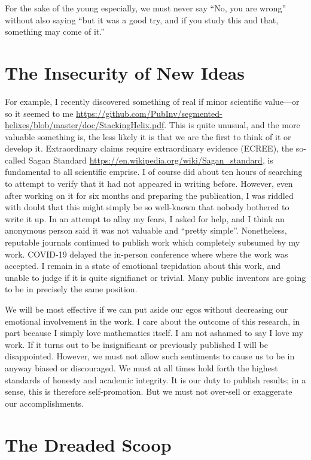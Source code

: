 \documentclass[
	fontsize=10pt, %
	twoside=false, %
	secnumdepth=1, %
]{kaobook}
\begin{document}
For the sake of the young especially, we must never say
``No, you are wrong'' without also saying ``but it was
a good try, and if you study this and that, something may come of it.''


\section{The Insecurity of New Ideas}

For example, I recently discovered something of
real if minor scientific value---or so it seemed to me \url{https://github.com/PubInv/segmented-helixes/blob/master/doc/StackingHelix.pdf}.
This is quite unusual, and the more valuable something is,
the less likely it is that we are the first to think of it
or develop it.
Extraordinary claims require extraordinary evidence (ECREE),
the so-called Sagan Standard \url{https://en.wikipedia.org/wiki/Sagan_standard},
is fundamental to all scientific emprise.
I of course did about ten hours of searching to
attempt to verify that it had not appeared in writing before.
However, even after working on it for six months and preparing
the publication, I was riddled with doubt that this might simply
be so well-known that nobody bothered to write it up.
In an attempt to allay my fears, I asked for help, and
I think an anonymous person said it was not valuable and ``pretty simple''.
Nonetheless, reputable journals continued to publish work
which completely subsumed by my work. COVID-19 delayed the
in-person conference where where the work was accepted.
I remain in a state of emotional trepidation about this work,
and unable to judge if it is quite signifianct or trivial.
Many public inventors are going to be in precisely the
same position.

We will be most effective if we can put aside our egos
without decreasing our emotional involvement in the work.
I care about the outcome of this research, in part because
I simply love mathematics itself.
I am not ashamed to say I love my work. If it turns out
to be insignificant or previously published I will be disappointed.
However, we must not allow such sentiments to cause
us to be in anyway biased or discouraged.
We must at all times hold forth the highest standards
of honesty and academic integrity.
It is our duty to publish results; in a sense,
this is therefore self-promotion.
But we must not over-sell or exaggerate our accomplishments.

\section{The Dreaded Scoop}
\end{document}
